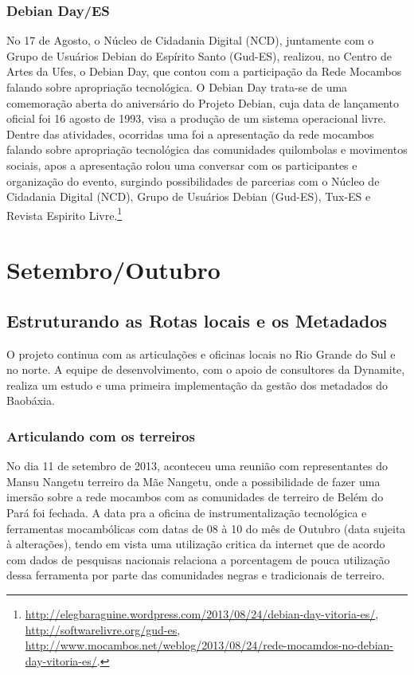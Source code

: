 \documentclass[a4paper, 11pt, oneside]{Relatorio_sem}  %
\begin{document}
\section{Debian Day/ES}
No 17 de Agosto, o Núcleo de Cidadania Digital (NCD), juntamente com o
Grupo de Usuários Debian do Espírito Santo (Gud-ES), realizou, no
Centro de Artes da Ufes, o Debian Day, que contou com a participação
da Rede Mocambos falando sobre apropriação tecnológica.  O Debian Day
trata-se de uma comemoração aberta do aniversário do Projeto Debian,
cuja data de lançamento oficial foi 16 agosto de 1993, visa a produção
de um sistema operacional livre.  Dentre das atividades, ocorridas uma
foi a apresentação da rede mocambos falando sobre apropriação
tecnológica das comunidades quilombolas e movimentos sociais, apos a
apresentação rolou uma conversar com os participantes e organização do
evento, surgindo possibilidades de parcerias com o Núcleo de Cidadania
Digital (NCD), Grupo de Usuários Debian (Gud-ES), Tux-ES e Revista
Espirito
Livre.\footnote{\url{http://elegbaraguine.wordpress.com/2013/08/24/debian-day-vitoria-es/},
  \url{http://softwarelivre.org/gud-es},
  \url{http://www.mocambos.net/weblog/2013/08/24/rede-mocamdos-no-debian-day-vitoria-es/}.}



\part{Setembro/Outubro} %
\chapter{Estruturando as Rotas locais e os Metadados}
O projeto continua com as articulações e oficinas locais no Rio Grande
do Sul e no norte. A equipe de desenvolvimento, com o apoio de
consultores da Dynamite, realiza um estudo e uma primeira
implementação da gestão dos metadados do Baobáxia.

\section{Articulando com os terreiros}
No dia 11 de setembro de 2013, aconteceu uma reunião com
representantes do Mansu Nangetu terreiro da Mãe Nangetu, onde a
possibilidade de fazer uma imersão sobre a rede mocambos com as
comunidades de terreiro de Belém do Pará foi fechada. A data pra a
oficina de instrumentalização tecnológica e ferramentas mocambólicas
com datas de 08 à 10 do mês de Outubro (data sujeita à alterações),
tendo em vista uma utilização critica da internet que de acordo com
dados de pesquisas nacionais relaciona a porcentagem de pouca
utilização dessa ferramenta por parte das comunidades negras e
tradicionais de terreiro.
\end{document}
